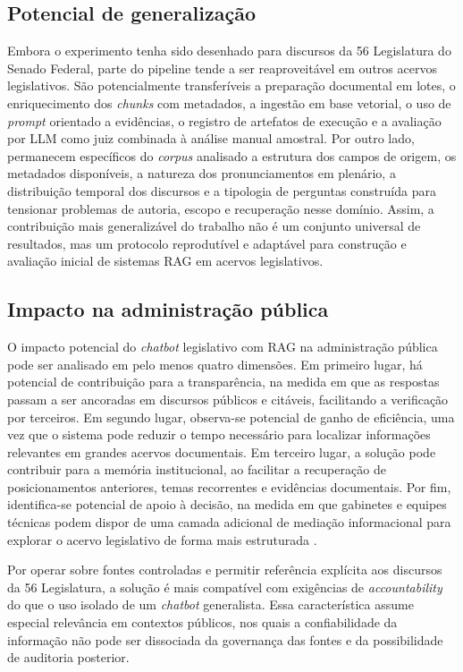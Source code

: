 \subsection{Potencial de generalização}

Embora o experimento tenha sido desenhado para discursos da 56\textordfeminine{} Legislatura do Senado Federal, parte do pipeline tende a ser reaproveitável em outros acervos legislativos. São potencialmente transferíveis a preparação documental em lotes, o enriquecimento dos \textit{chunks} com metadados, a ingestão em base vetorial, o uso de \textit{prompt} orientado a evidências, o registro de artefatos de execução e a avaliação por LLM como juiz combinada à análise manual amostral. Por outro lado, permanecem específicos do \textit{corpus} analisado a estrutura dos campos de origem, os metadados disponíveis, a natureza dos pronunciamentos em plenário, a distribuição temporal dos discursos e a tipologia de perguntas construída para tensionar problemas de autoria, escopo e recuperação nesse domínio. Assim, a contribuição mais generalizável do trabalho não é um conjunto universal de resultados, mas um protocolo reprodutível e adaptável para construção e avaliação inicial de sistemas RAG em acervos legislativos.

\subsection{Impacto na administração pública}

O impacto potencial do \textit{chatbot} legislativo com RAG na administração pública pode ser analisado em pelo menos quatro dimensões. Em primeiro lugar, há potencial de contribuição para a transparência, na medida em que as respostas passam a ser ancoradas em discursos públicos e citáveis, facilitando a verificação por terceiros. Em segundo lugar, observa-se potencial de ganho de eficiência, uma vez que o sistema pode reduzir o tempo necessário para localizar informações relevantes em grandes acervos documentais. Em terceiro lugar, a solução pode contribuir para a memória institucional, ao facilitar a recuperação de posicionamentos anteriores, temas recorrentes e evidências documentais. Por fim, identifica-se potencial de apoio à decisão, na medida em que gabinetes e equipes técnicas podem dispor de uma camada adicional de mediação informacional para explorar o acervo legislativo de forma mais estruturada \parencite{martelloteViola2025organizacaoConhecimento,deAlmeidaSantos2025aiGovernance,wfd2023guidelinesAiParliaments}.

Por operar sobre fontes controladas e permitir referência explícita aos discursos da 56\textordfeminine{} Legislatura, a solução é mais compatível com exigências de \textit{accountability} do que o uso isolado de um \textit{chatbot} generalista. Essa característica assume especial relevância em contextos públicos, nos quais a confiabilidade da informação não pode ser dissociada da governança das fontes e da possibilidade de auditoria posterior.
